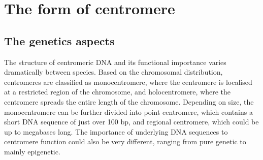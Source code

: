 \section{The form of centromere}
\subsection{The genetics aspects}

The structure of centromeric DNA and its functional importance varies dramatically between species. Based on the chromosomal distribution, centromeres are classified as monocentromere, where the centromere is localised at a restricted region of the chromosome, and holocentromere, where the centromere spreads the entire length of the chromosome. Depending on size, the monocentromere can be further divided into point centromere, which contains a short DNA sequence of just over 100 bp, and regional centromere, which could be up to megabases long. The importance of underlying DNA sequences to centromere function could also be very different, ranging from pure genetic to mainly epigenetic. 

